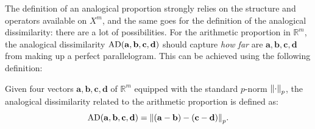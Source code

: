 The definition of an analogical proportion strongly relies on the structure and
operators available on $X^m$, and the same goes for the definition of the
analogical dissimilarity: there are a lot of possibilities. For the arithmetic
proportion in $\mathbb{R}^m$, the analogical dissimilarity  $\AD(\mathbf{a},
\mathbf{b},\mathbf{c},\mathbf{d})$ should capture \textit{how far}
are $\mathbf{a}, \mathbf{b},\mathbf{c},\mathbf{d}$ from making up a perfect
parallelogram. This can be achieved using the following definition:

\begin{definition}
  \label{DEF:AD_arithmetic_proportion}
  Given four vectors $\mathbf{a}, \mathbf{b},\mathbf{c},\mathbf{d}$ of
  $\mathbb{R}^m$ equipped with the standard $p$-norm $\norm{p}{\cdot}$, the
  analogical dissimilarity related to the arithmetic proportion is defined as:
  $$\text{AD}(\mathbf{a}, \mathbf{b},\mathbf{c},\mathbf{d}) =
  \norm{p}{(\mathbf{a} - \mathbf{b}) - (\mathbf{c} - \mathbf{d})}.$$
\end{definition}

